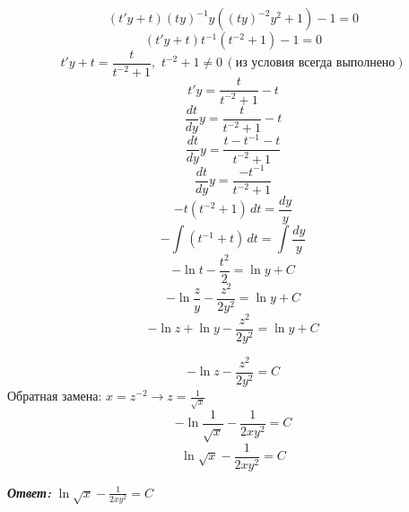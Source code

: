 \documentclass[a5paper, 10pt]{article}
\theoremstyle{definition}
\theoremstyle{plain}
\theoremstyle{remark}
\begin{document}
\begin{equation*}
(t'y + t)  (ty)^{-1}y((ty)^{-2}y^2+ 1) -1 = 0 
\end{equation*}
\begin{equation*}
(t'y + t) t^{-1}(t^{-2}+ 1) -1 = 0 
\end{equation*}
\begin{equation*}
t'y + t= \frac{t}{t^{-2}+ 1}, \, \, t^{-2}+ 1 \neq 0 \, (\textit{из условия всегда выполнено})
\end{equation*}
\begin{equation*}
t'y = \frac{t}{t^{-2}+ 1} - t
\end{equation*}
\begin{equation*}
\frac{dt}{dy}y = \frac{t}{t^{-2}+ 1} - t
\end{equation*}
\begin{equation*}
\frac{dt}{dy}y = \frac{t - t^{-1}- t }{t^{-2}+ 1} 
\end{equation*}
\begin{equation*}
\frac{dt}{dy}y = \frac{- t^{-1}}{t^{-2}+ 1} 
\end{equation*}
\begin{equation*}
-t(t^{-2}+ 1) \, dt  = \frac{dy}{y}
\end{equation*}
\begin{equation*}
- \int (t^{-1} + t) \, dt  = \int \frac{dy}{y}
\end{equation*}
\begin{equation*}
- \ln t - \frac{t^2}{2}  = \ln y + C
\end{equation*}
\begin{equation*}
- \ln \frac{z}{y} - \frac{z^2}{2y^2}  = \ln y + C
\end{equation*}
\begin{equation*}
- \ln z +  \ln y - \frac{z^2}{2y^2}  = \ln y + C
\end{equation*}

\begin{equation*}
- \ln z  - \frac{z^2}{2y^2}  =  C
\end{equation*}
Обратная замена: $x = z^{-2} \to z = \frac{1}{\sqrt{x}}$
\begin{equation*}
- \ln \frac{1}{\sqrt{x}}   - \frac{1}{2xy^2}  =  C
\end{equation*}
\begin{equation*}
 \ln \sqrt{x}   - \frac{1}{2xy^2}  =  C
\end{equation*}

\textit{\textbf{Ответ:}} $\ln \sqrt{x}   - \frac{1}{2xy^2}  =  C$
\end{document}
